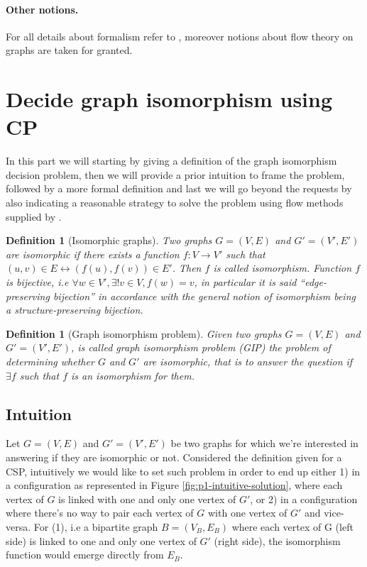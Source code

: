 \documentclass[a4paper,12pt]{article}
\theoremstyle{newplanestyle}
\theoremstyle{newdefinitionstyle}
\newtheorem{newdef}[newtheo]{Definition}
\theoremstyle{newprovestyle}
\begin{document}
\paragraph*{Other notions.}
For all details about formalism refer to \cite{Regin:1996:GAC:1892875.1892906}, moreover notions about flow theory on graphs are taken for granted.

\cleardoublepage

\section{Decide graph isomorphism using CP}\label{sec-gip}
In this part we will starting by giving a definition of the graph isomorphism decision problem, then we will provide a prior intuition to frame the problem, followed by a more formal definition and last we will go beyond the requests by also indicating a reasonable strategy to solve the problem using flow methods supplied by \cite{Regin:1996:GAC:1892875.1892906}.

\begin{newdef}[Isomorphic graphs]
	Two graphs $G=(V,E)$ and $G'=(V',E')$ are \textit{isomorphic} if there exists a function $f : V \to V'$ such that $(u,v) \in E \leftrightarrow (f(u),f(v)) \in E'$. Then $f$ is called \textit{isomorphism}. Function $f$ is bijective, i.e $\forall w \in V', \exists !v \in V, f(w) = v$, in particular it is said ``edge-preserving bijection'' in accordance with the general notion of isomorphism being a structure-preserving bijection.
\end{newdef}\label{def-isomorphic-graphs}

\begin{newdef}[Graph isomorphism problem]
	Given two graphs $G=(V,E)$ and $G'=(V',E')$, is called \textit{graph isomorphism problem} (GIP) the problem of determining whether $G$ and $G'$ are isomorphic, that is to answer the question if $\exists f$ such that $f$ is an isomorphism for them.
\end{newdef}

\subsection{Intuition}
Let $G=(V,E)$ and $G'=(V',E')$ be two graphs for which we're interested in answering if they are isomorphic or not. Considered the definition given for a CSP, intuitively we would like to set such problem in order to end up either 1) in a configuration as represented in Figure \ref{fig:p1-intuitive-solution}, where each vertex of $G$ is linked with one and only one vertex of $G'$, or 2) in a configuration where there's no way to pair each vertex of $G$ with one vertex of $G'$ and vice-versa. For (1), i.e a bipartite graph $B=(V_B, E_B)$ where each vertex of G (left side) is linked to one and only one vertex of $G'$ (right side), the isomorphism function would emerge directly from $E_B$.
\end{document}
